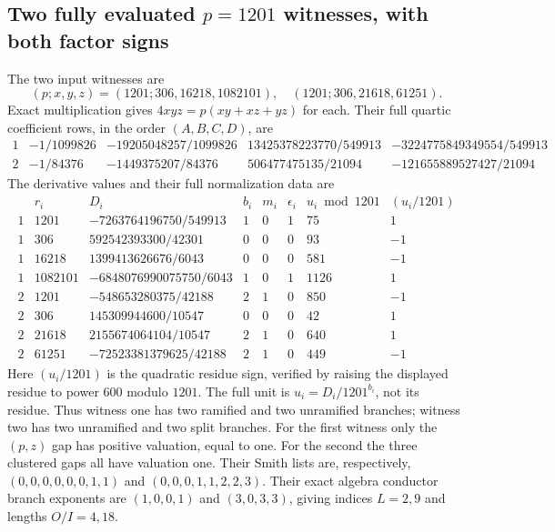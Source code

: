 \documentclass[11pt]{article}
\begin{document}
\subsection{Two fully evaluated $p=1201$ witnesses, with both factor signs}
The two input witnesses are
\begin{equation}
 (p;x,y,z)=(1201;306,16218,1082101),\quad
 (1201;306,21618,61251).                                 \tag{ISR24}
\end{equation}
Exact multiplication gives $4xyz=p(xy+xz+yz)$ for each. Their full
quartic coefficient rows, in the order $(A,B,C,D)$, are
\begin{equation}
 \begin{array}{c|rrrr}
 1&-1/1099826&-19205048257/1099826&13425378223770/549913&
     -3224775849349554/549913\\
 2&-1/84376&-1449375207/84376&506477475135/21094&
     -121655889527427/21094
 \end{array}                                             \tag{ISR25}
\end{equation}
The derivative values and their full normalization data are
\begin{equation}
\begin{array}{c|r|r|c|c|c|r|r}
 &r_i&D_i&b_i&m_i&\epsilon_i&u_i\bmod1201&
          (u_i/1201)\\\hline
1&1201&-7263764196750/549913&1&0&1&75&1\\
1&306&592542393300/42301&0&0&0&93&-1\\
1&16218&1399413626676/6043&0&0&0&581&-1\\
1&1082101&-6848076990075750/6043&1&0&1&1126&1\\\hline
2&1201&-548653280375/42188&2&1&0&850&-1\\
2&306&145309944600/10547&0&0&0&42&1\\
2&21618&2155674064104/10547&2&1&0&640&1\\
2&61251&-72523381379625/42188&2&1&0&449&-1
\end{array}                                             \tag{ISR26}
\end{equation}
Here $(u_i/1201)$ is the quadratic residue sign, verified by raising
the displayed residue to power $600$ modulo $1201$. The full unit
is $u_i=D_i/1201^{b_i}$, not its residue. Thus witness one has two
ramified and two unramified branches; witness two has two unramified
and two split branches. For the first witness only the $(p,z)$ gap
has positive valuation, equal to one. For the second the three
clustered gaps all have valuation one. Their Smith lists are,
respectively, $(0,0,0,0,0,0,1,1)$ and $(0,0,0,1,1,2,2,3)$.
Their exact algebra conductor branch exponents are $(1,0,0,1)$
and $(3,0,3,3)$, giving indices $L=2,9$ and lengths $O/I=4,18$.
\end{document}
